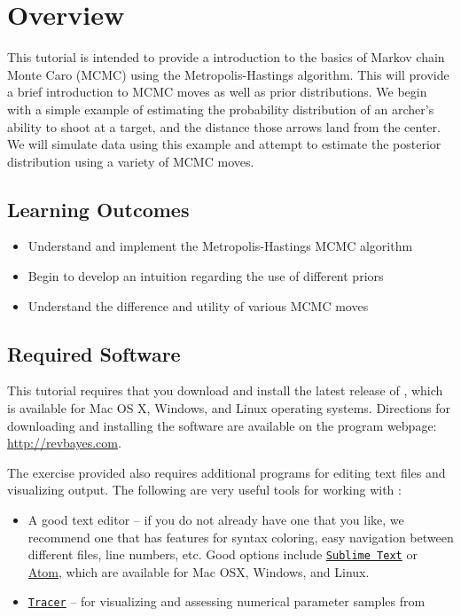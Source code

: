 
\section{Overview}\label{sect:Overview}

This tutorial is intended to provide a introduction to the basics of Markov chain Monte Caro (MCMC) using the  Metropolis-Hastings algorithm. This will provide a brief introduction to MCMC moves as well as prior distributions. We begin with a simple example of estimating the probability distribution of an archer's ability to shoot at a target, and the distance those arrows land from the center. We will simulate data using this example and attempt to estimate the posterior distribution using a variety of MCMC moves. 

\bigskip
\subsection{Learning Outcomes}
\begin{itemize}
\item Understand and implement the Metropolis-Hastings MCMC algorithm
\item Begin to develop an intuition regarding the use of different priors 
\item Understand the difference and utility of various MCMC moves 
\end{itemize}

\subsection{Required Software}\label{subsect:Overview-Requirements}

This tutorial requires that you download and install the latest release of \RevBayes \citep{Hoehna2017a}, which is available for Mac OS X, Windows, and Linux operating systems. 
Directions for downloading and installing the software are available on the program webpage:
\href{http://revbayes.com/}{http://revbayes.com}.

The exercise provided also requires additional programs for editing text files and visualizing output. 
The following are very useful tools for working with \RevBayes:
\begin{itemize}[noitemsep,topsep=0pt]
\item A good text editor -- if you do not already have one that you like, we recommend one that has features for syntax coloring, easy navigation between different files, line numbers, etc.
Good options include \href{http://www.sublimetext.com/}{\tt Sublime Text} or \href{https://atom.io/}{Atom}, which are available for Mac OSX, Windows, and Linux.
\item \href{http://tree.bio.ed.ac.uk/software/tracer/}{\tt Tracer} -- for visualizing and assessing numerical parameter samples from \RevBayes
\end{itemize}

